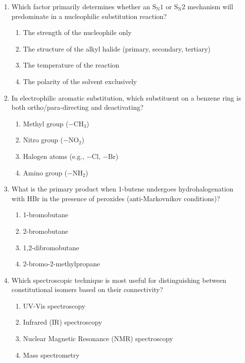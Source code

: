 \documentclass[11pt]{article}
\begin{document}
\begin{enumerate}[label=\textbf{\arabic*.}]

  \item Which factor primarily determines whether an $\mathrm{S_N1}$ or $\mathrm{S_N2}$ mechanism 
  will predominate in a nucleophilic substitution reaction?
  \begin{enumerate}[label=(\Alph*)]
    \item The strength of the nucleophile only
    \item The structure of the alkyl halide (primary, secondary, tertiary)
    \item The temperature of the reaction
    \item The polarity of the solvent exclusively
  \end{enumerate}

  \item In electrophilic aromatic substitution, which substituent on a benzene ring is both 
  ortho/para-directing and deactivating?
  \begin{enumerate}[label=(\Alph*)]
    \item Methyl group ($-\mathrm{CH_3}$)
    \item Nitro group ($-\mathrm{NO_2}$)
    \item Halogen atoms (e.g., $-\mathrm{Cl}$, $-\mathrm{Br}$)
    \item Amino group ($-\mathrm{NH_2}$)
  \end{enumerate}

  \item What is the primary product when 1-butene undergoes hydrohalogenation with HBr in the 
  presence of peroxides (anti-Markovnikov conditions)?
  \begin{enumerate}[label=(\Alph*)]
    \item 1-bromobutane
    \item 2-bromobutane
    \item 1,2-dibromobutane
    \item 2-bromo-2-methylpropane
  \end{enumerate}

  \item Which spectroscopic technique is most useful for distinguishing between constitutional 
  isomers based on their connectivity?
  \begin{enumerate}[label=(\Alph*)]
    \item UV-Vis spectroscopy
    \item Infrared (IR) spectroscopy
    \item Nuclear Magnetic Resonance (NMR) spectroscopy
    \item Mass spectrometry
  \end{enumerate}


\end{enumerate}
\end{document}
